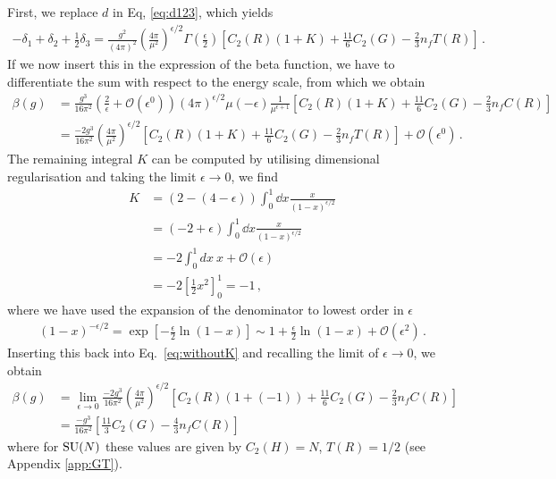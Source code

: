 First, we replace $d$ in Eq, \eqref{eq:d123}, which yields
\begin{align}
    -\delta_1+\delta_2+\frac{1}{2}\delta_3=\frac{g^2}{(4\pi)^{2}} \left(\frac{4 \pi}{\mu^{2}} \right)^{\epsilon/2}\Gamma\left(\frac{\epsilon}{2}\right)\left[ C_2(R)(1 + K) + \frac{11}{6} C_2(G) - \frac{2}{3} n_f T(R) \right]\,.
\end{align}
If we now insert this in the expression of the beta function, we have to differentiate the sum with respect to the energy scale, from which we obtain
\begin{align}
    \beta(g)&=\frac{g^3}{16\pi^2} \left( \frac{2}{\epsilon} + \mathcal{O}(\epsilon^0) \right) (4\pi)^{\epsilon/2} \mu (-\epsilon) \frac{1}{\mu^{\epsilon+1}} \left[ C_2(R)(1 + K) + \frac{11}{6} C_2(G) - \frac{2}{3} n_f C(R) \right]\nonumber\\
    &= \frac{-2g^3}{16\pi^2} \left( \frac{4\pi}{\mu^2} \right)^{\epsilon/2} \left[ C_2(R)(1 + K) + \frac{11}{6} C_2(G) - \frac{2}{3} n_f T(R) \right] + \mathcal{O}(\epsilon^0)\,.\label{eq:withoutK}
\end{align}
The remaining integral $K$ can be computed by utilising dimensional regularisation and taking the limit $\epsilon\to0$, we find
\begin{align}
    K &= (2-(4-\epsilon)) \int_0^1 \dd x \frac{x}{(1-x)^{\epsilon/2}} \nonumber\\
    &= (-2+\epsilon) \int_0^1 \dd x \frac{x}{(1-x)^{\epsilon/2}}\nonumber \\
    &= -2 \int_0^1 dx\ x + \mathcal{O}(\epsilon) \nonumber\\
    &= -2 \left[ \frac{1}{2} x^2 \right]_0^1 = -1\,,
\end{align}
where we have used the expansion of the denominator to lowest order in  $\epsilon$
\begin{align}
    (1-x)^{-\epsilon/2} = \exp[-\frac{\epsilon}{2} \ln(1-x)] \sim 1 +\frac{\epsilon}{2}\ln(1-x) + \mathcal{O}(\epsilon^2)\,.
\end{align}    
Inserting this back into Eq.~\eqref{eq:withoutK} and recalling the limit of $\epsilon\to0$, we obtain
\begin{align}
    \beta(g)&= \lim_{\epsilon\to0}\frac{-2g^3}{16\pi^2} \left( \frac{4\pi}{\mu^2} \right)^{\epsilon/2}\left[ C_2(R) (1 + (-1)) + \frac{11}{6} C_2(G) - \frac{2}{3} n_f C(R) \right] \nonumber\\&=
     \frac{-g^3}{16\pi^2} \left[ \frac{11}{3} C_2(G) - \frac{4}{3} n_f C(R) \right]\label{eq:derivedbetag}
\end{align}
where for $\mathrm{SU}(N)$ these values are given by $C_2(H) = N$, $T(R) = 1/2$ (see Appendix \ref{app:GT}). 

